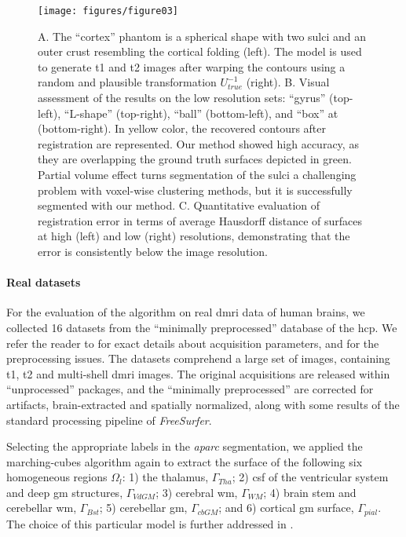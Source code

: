 \begin{figure*}
	\texttt{[image: figures/figure03]}
	\caption{A. The ``cortex'' phantom is a spherical shape with two sulci and an
	  outer crust resembling the cortical folding (left).
	The model is used to generate \gls*{t1} and \gls*{t2} images after warping the
	  contours using a random and plausible transformation $U_{true}^{-1}$ (right).
	B. Visual assessment of the results on the low resolution sets:
	  ``gyrus'' (top-left), ``L-shape'' (top-right), ``ball'' (bottom-left),
	  and ``box'' at (bottom-right).
	In yellow color, the recovered contours after registration are represented.
	Our method showed high accuracy, as they are overlapping the ground truth surfaces
	  depicted in green.
	Partial volume effect turns segmentation of the sulci a challenging problem with voxel-wise
	  clustering methods, but it is successfully segmented with our method.
	C. Quantitative evaluation of registration error in terms of average Hausdorff distance of
	  surfaces at high (left) and low (right) resolutions, demonstrating that the error is
	  consistently below the image resolution.
	  }\label{fig:phantom}
\end{figure*}

\paragraph*{Real datasets} %
\label{sec:human_connectome}
%
For the evaluation of the algorithm on real \gls*{dmri} data of human brains,
  we collected 16 datasets from the ``minimally preprocessed''
	 database of the \gls*{hcp}.
We refer the reader to \citep{essen_human_2012} for exact details about acquisition
  parameters, and \citep{glasser_minimal_2013} for the preprocessing issues.
The datasets comprehend a large set of images, containing \gls*{t1}, \gls*{t2} and
  multi-shell \gls*{dmri} images.
The original acquisitions are released within ``unprocessed'' packages, and
  the ``minimally preprocessed'' are corrected for artifacts, brain-extracted
  and spatially normalized, along with some results of the standard processing
  pipeline of \emph{FreeSurfer}.

Selecting the appropriate labels in the \emph{aparc} segmentation, we applied
  the marching-cubes algorithm again to extract the surface of the following
  six homogeneous regions $\Omega_l$:
  1) the thalamus, $\Gamma_{Tha}$;
  2) \gls*{csf} of the ventricular system and deep \gls*{gm} structures, $\Gamma_{VdGM}$;
  3) cerebral \gls*{wm}, $\Gamma_{WM}$;
  4) brain stem and cerebellar \gls*{wm}, $\Gamma_{Bst}$;
	5) cerebellar \gls*{gm}, $\Gamma_{cbGM}$; and
	6) cortical \gls*{gm} surface, $\Gamma_{pial}$.
The choice of this particular model is further addressed in .

